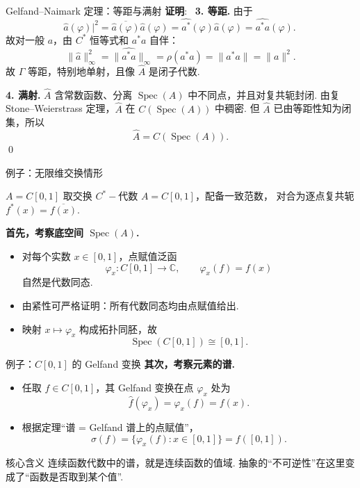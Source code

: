 \documentclass[notheorems,11pt]{beamer}
\theoremstyle{plain}
\numberwithin{theorem}{section}
\numberwithin{lemma}{section}
\numberwithin{corollary}{section}
\theoremstyle{example}
\renewenvironment{proof}[1][证明]{\textbf{#1}:~}{\qed\par}
\DeclareMathOperator{\Spec}{Spec}
\begin{document}
\begin{frame}{Gelfand--Naimark 定理：等距与满射}
  \begin{proof}\small
    \textbf{3. 等距.}
    由于\begin{equation*}
    \widehat{a}(\varphi)|^2=\overline{\widehat{a}(\varphi)}\widehat{a}(\varphi)=\widehat{a^*}(\varphi)\widehat{a}(\varphi)=\widehat{a^*a}(\varphi).\
    \end{equation*}
    故对一般 $a$，由 $C^*$ 恒等式和 $a^*a$ 自伴：
    \[
      \|\widehat a\|_\infty^2
      =\|\widehat{a^*a}\|_\infty
      =\rho(a^*a)
      =\|a^*a\|
      =\|a\|^2.
    \]
    故 $\Gamma$ 等距，特别地单射，且像 $\widehat A$ 是闭子代数.

    \medskip
    \textbf{4. 满射.}
    $\widehat A$ 含常数函数、分离 $\Spec(A)$ 中不同点，并且对复共轭封闭.
    由复 Stone--Weierstrass 定理，$\widehat A$ 在 $C(\Spec(A))$ 中稠密.
    但 $\widehat A$ 已由等距性知为闭集，所以
    \[
      \widehat A=C(\Spec(A)).
    \]
  \end{proof}
\end{frame}

\begin{frame}{例子：无限维交换情形}
  \begin{exampleblock}{$A=C[0,1]$}
    取交换 $C^*-\!$代数 $A=C[0,1]$，配备一致范数，
    对合为逐点复共轭 $f^*(x)=\overline{f(x)}$.
  \end{exampleblock}
  \pause
  \textbf{首先，考察底空间 $\Spec(A)$.}
  \begin{itemize}
    \item 对每个实数 $x\in[0,1]$，点赋值泛函
      \[
        \varphi_x:C[0,1]\to\mathbb C,\qquad \varphi_x(f)=f(x)
      \]
      自然是代数同态.
    \item 由紧性可严格证明：所有代数同态均由点赋值给出.
    \item 映射 $x\mapsto\varphi_x$ 构成拓扑同胚，故
      \[
        \Spec(C[0,1])\cong[0,1].
      \]
  \end{itemize}
\end{frame}

\begin{frame}{例子：$C[0,1]$ 的 Gelfand 变换}
  \textbf{其次，考察元素的谱.}
  \begin{itemize}
    \item 任取 $f\in C[0,1]$，其 Gelfand 变换在点 $\varphi_x$ 处为
      \[
        \widehat f(\varphi_x)=\varphi_x(f)=f(x).
      \]
    \item 根据定理“谱 = Gelfand 谱上的点赋值”，
      \[
        \sigma(f)
        =\{\varphi_x(f):x\in[0,1]\}
        =f([0,1]).
      \]
  \end{itemize}
  \pause
  \begin{block}{核心含义}
    连续函数代数中的谱，就是连续函数的值域.
    抽象的“不可逆性”在这里变成了“函数是否取到某个值”.
  \end{block}
\end{frame}
\end{document}
